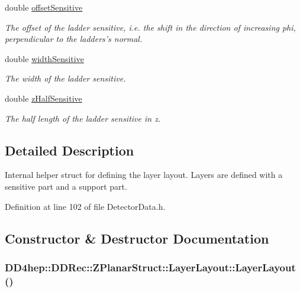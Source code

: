 \begin{DoxyCompactItemize}
double \hyperlink{struct_d_d4hep_1_1_d_d_rec_1_1_z_planar_struct_1_1_layer_layout_a80e60caf98db3f296a3d995e77c3f8c6}{offsetSensitive}
\begin{DoxyCompactList}\small\item\em The offset of the ladder sensitive, i.e. the shift in the direction of increasing phi, perpendicular to the ladders's normal. \item\end{DoxyCompactList}\item 
double \hyperlink{struct_d_d4hep_1_1_d_d_rec_1_1_z_planar_struct_1_1_layer_layout_ab19bdf088e4b8dc7549454825c9592c8}{widthSensitive}
\begin{DoxyCompactList}\small\item\em The width of the ladder sensitive. \item\end{DoxyCompactList}\item 
double \hyperlink{struct_d_d4hep_1_1_d_d_rec_1_1_z_planar_struct_1_1_layer_layout_ae8c448242045e1e213990a74150b5df7}{zHalfSensitive}
\begin{DoxyCompactList}\small\item\em The half length of the ladder sensitive in z. \item\end{DoxyCompactList}\end{DoxyCompactItemize}


\subsection{Detailed Description}
Internal helper struct for defining the layer layout. Layers are defined with a sensitive part and a support part. 

Definition at line 102 of file DetectorData.h.

\subsection{Constructor \& Destructor Documentation}
\hypertarget{struct_d_d4hep_1_1_d_d_rec_1_1_z_planar_struct_1_1_layer_layout_ab128733c50738ce7dd0c00c44e16e57c}{
\subsubsection[{LayerLayout}]{\setlength{\rightskip}{0pt plus 5cm}DD4hep::DDRec::ZPlanarStruct::LayerLayout::LayerLayout ()}}
\label{struct_d_d4hep_1_1_d_d_rec_1_1_z_planar_struct_1_1_layer_layout_ab128733c50738ce7dd0c00c44e16e57c}


